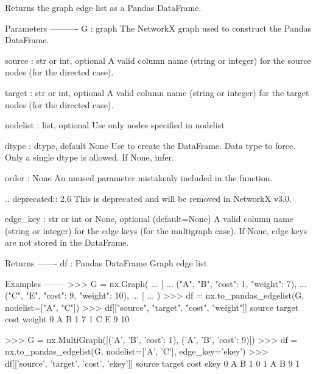 \begin{DoxyVerb}Returns the graph edge list as a Pandas DataFrame.

Parameters
----------
G : graph
    The NetworkX graph used to construct the Pandas DataFrame.

source : str or int, optional
    A valid column name (string or integer) for the source nodes (for the
    directed case).

target : str or int, optional
    A valid column name (string or integer) for the target nodes (for the
    directed case).

nodelist : list, optional
   Use only nodes specified in nodelist

dtype : dtype, default None
    Use to create the DataFrame. Data type to force.
    Only a single dtype is allowed. If None, infer.

order : None
    An unused parameter mistakenly included in the function.

    .. deprecated:: 2.6
        This is deprecated and will be removed in NetworkX v3.0.

edge_key : str or int or None, optional (default=None)
    A valid column name (string or integer) for the edge keys (for the
    multigraph case). If None, edge keys are not stored in the DataFrame.

Returns
-------
df : Pandas DataFrame
   Graph edge list

Examples
--------
>>> G = nx.Graph(
...     [
...         ("A", "B", {"cost": 1, "weight": 7}),
...         ("C", "E", {"cost": 9, "weight": 10}),
...     ]
... )
>>> df = nx.to_pandas_edgelist(G, nodelist=["A", "C"])
>>> df[["source", "target", "cost", "weight"]]
  source target  cost  weight
0      A      B     1       7
1      C      E     9      10

>>> G = nx.MultiGraph([('A', 'B', {'cost': 1}), ('A', 'B', {'cost': 9})])
>>> df = nx.to_pandas_edgelist(G, nodelist=['A', 'C'], edge_key='ekey')
>>> df[['source', 'target', 'cost', 'ekey']]
  source target  cost  ekey
0      A      B     1     0
1      A      B     9     1\end{DoxyVerb}
 \mbox{\label{namespacenetworkx_1_1convert__matrix_a47cedef23442ab34bf69fffb4119a442}} 
